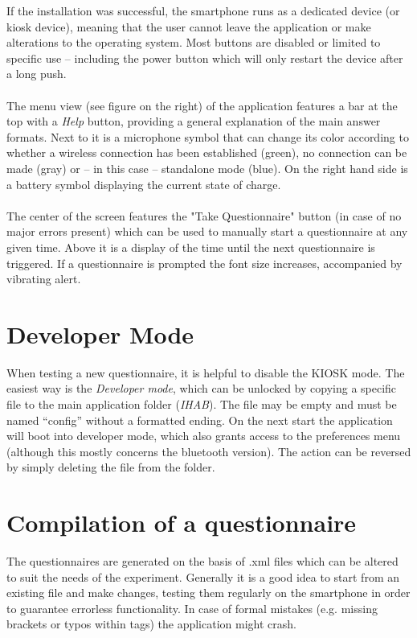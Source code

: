 \documentclass[11pt,a4paper,titlepage]{article}
\begin{document}
If the installation was successful, the smartphone runs as a dedicated device (or kiosk device), meaning that the user cannot leave the application or make alterations to the operating system. Most buttons are disabled or limited to specific use -- including the power button which will only restart the device after a long push.\\
\\
The menu view (see figure on the right) of the application features a bar at the top with a \textit{Help} button, providing a general explanation of the main answer formats. Next to it is a microphone symbol that can change its color according to whether a wireless connection has been established (green), no connection can be made (gray) or -- in this case -- standalone mode (blue). On the right hand side is a battery symbol displaying the current state of charge.\\
\\
The center of the screen features the "Take Questionnaire" button (in case of no major errors present) which can be used to manually start a questionnaire at any given time. Above it is a display of the time until the next questionnaire is triggered. If a questionnaire is prompted the font size increases, accompanied by vibrating alert.\\

\section{Developer Mode}\label{sub:developer}

When testing a new questionnaire, it is helpful to disable the KIOSK mode. The easiest way is the \textit{Developer mode}, which can be unlocked by copying a specific file to the main application folder (\textit{IHAB}). The file may be empty and must be named ``config'' without a formatted ending. On the next start the application will boot into developer mode, which also grants access to the preferences menu (although this mostly concerns the bluetooth version). The action can be reversed by simply deleting the file from the folder.

\section{Compilation of a questionnaire}

The questionnaires are generated on the basis of .xml files which can be altered to suit the needs of the experiment. Generally it is a good idea to start from an existing file and make changes, testing them regularly on the smartphone in order to guarantee errorless functionality. In case of formal mistakes (e.g. missing brackets or typos within tags) the application might crash. 
\end{document}
